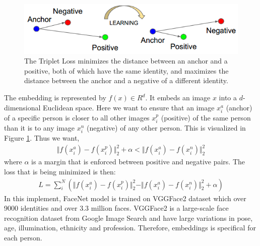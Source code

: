 \documentclass[journal, twocolumn]{IEEEtran}
\begin{document}
\begin{figure}
    \centering
    \includegraphics[width=1\linewidth]{img/triplet.png}
	\caption{The Triplet Loss minimizes the distance between an anchor and a positive, both of which have the same identity, and maximizes the distance between the anchor and a negative of a different identity.}
	\label{fig:triplet}
\end{figure}

The embedding is represented by $f(x) \in R^d$. It embeds an image $x$ into a $d$-dimensional Euclidean space. Here we want to ensure that an image $x_i^a$ (anchor) of a specific person is closer to all other images $x_i^p$ (positive) of the same person than it is to any image $x_i^n$ (negative) of any other person. This is visualized in Figure \ref{fig:triplet}. Thus we want, 
\begin{align}
	\Vert f(x_i^a) - f(x_i^p) \Vert_2^2 + \alpha < \Vert f(x_i^a) - f(x_i^n) \Vert_2^2
\end{align}
where $\alpha$ is a margin that is enforced between positive and negative pairs. The loss that is being minimized is then: 
\begin{align}
	L = \sum_i^N(\Vert f(x_i^a) - f(x_i^p) \Vert_2^2  - \Vert f(x_i^a) - f(x_i^n) \Vert_2^2 + \alpha)
\end{align}
In this implement, FaceNet model is trained on VGGFace2 dataset which over 9000 identities and over 3.3 million faces. VGGFace2 is a large-scale face recognition dataset from Google Image Search and have large variations in pose, age, illumination, ethnicity and profession. Therefore, embeddings is specifical for each person. 
\end{document}
